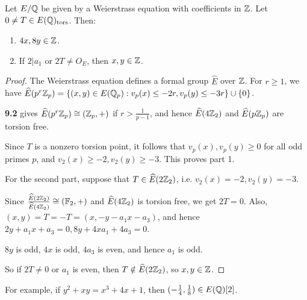 \documentclass[10pt,a4paper]{article}
\begin{document}
\begin{lemma}
  Let $E/\mathbb{Q}$ be given by a Weierstrass equation with coefficients in $\mathbb{Z}$. Let $0 \neq T \in E(\mathbb{Q})_\text{tors}$. Then:
  \begin{enumerate}
    \item $4x, 8y \in \mathbb{Z}$.
    \item If $2|a_1$ or $2T \neq O_E$, then $x, y \in \mathbb{Z}$.
  \end{enumerate}
\end{lemma}
\begin{proof}
  The Weierstrass equation defines a formal group $\hat{E}$ over $\mathbb{Z}$. For $r\geq 1$, we have $\widehat{E}(p^r\mathbb{Z}_p) = \{(x,y) \in E(\mathbb{Q}_p) : v_p(x)\leq -2r, v_p(y)\leq -3r\}\cup \{0\}$.

  \textbf{9.2} gives $\widehat{E}(p^r\mathbb{Z}_p) \cong (\mathbb{Z}_p, +)$ if $r >\frac{1}{p-1}$, and hence $\widehat{E}(4\mathbb{Z}_2)$ and $\widehat{E}(p\mathbb{Z}_p)$ are torsion free.

  Since $T$ is a nonzero torsion point, it follows that $v_p(x), v_p(y) \geq 0$ for all odd primes $p$, and $v_2(x) \geq -2, v_2(y) \geq -3$. This proves part 1.

  For the second part, suppose that $T \in \widehat{E}(2\mathbb{Z}_2)$, i.e. $v_2(x) = -2, v_2(y)=-3$.

  Since $\frac{\widehat{E}(2\mathbb{Z}_2)}{\widehat{E}(4\mathbb{Z}_2)} \cong (\mathbb{F}_2, +)$ and $\widehat{E}(4\mathbb{Z}_2)$ is torsion free, we get $2T = 0$. Also, $(x, y) = T = -T = (x, -y-a_1x-a_3)$, and hence $2y+a_1x+a_3 = 0, 8y+4xa_1+4a_3 = 0$.

  $8y$ is odd, $4x$ is odd, $4a_3$ is even, and hence $a_1$ is odd.

  So if $2T \neq 0$ or $a_1$ is even, then $T \notin \widehat{E}(2\mathbb{Z}_2)$, so $x, y \in \mathbb{Z}$.
\end{proof}
For example, if $y^2+xy = x^3+4x+1$, then $(-\frac14, \frac18) \in E(\mathbb{Q})[2]$.
\end{document}
